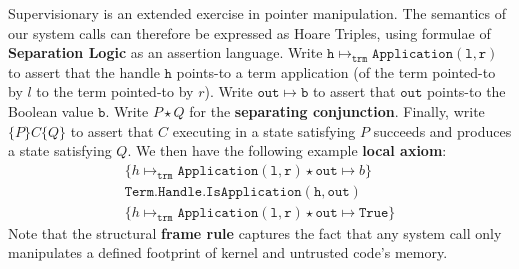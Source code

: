 \documentclass[sigplan, review]{acmart}
\newcommand{\deffont}[1]{\textbf{#1}}
\begin{document}
Supervisionary is an extended exercise in pointer manipulation.
The semantics of our system calls can therefore be expressed as Hoare Triples, using formulae of \deffont{Separation Logic} as an assertion language.
Write $\mathtt{h} \mapsto_{\mathtt{trm}} \mathtt{Application(l, r)}$ to assert that the handle $\mathtt{h}$ points-to a term application (of the term pointed-to by $l$ to the term pointed-to by $r$).
Write $\mathtt{out} \mapsto \mathtt{b}$ to assert that $\mathtt{out}$ points-to the Boolean value $\mathtt{b}$.
Write $P \star Q$ for the \deffont{separating conjunction}.
Finally, write $\{ P \} C \{ Q \}$ to assert that $C$ executing in a state satisfying $P$ succeeds and produces a state satisfying $Q$.
We then have the following example \deffont{local axiom}:
\begin{gather*}
\{ h \mapsto_{\mathtt{trm}} \mathtt{Application(l, r)} \star \mathtt{out} \mapsto b \} \\
\mathtt{Term.Handle.IsApplication(h, out)} \\
\{ h \mapsto_{\mathtt{trm}} \mathtt{Application(l, r)} \star \mathtt{out} \mapsto \mathtt{True} \}
\end{gather*}
Note that the structural \deffont{frame rule} captures the fact that any system call only manipulates a defined footprint of kernel and untrusted code's memory.

\fi
\end{document}
